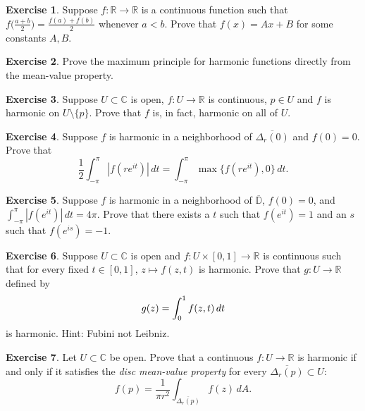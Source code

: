 \documentclass[12pt,openany]{book}
\newcommand{\avoidbreak}{\postdisplaypenalty=100}
\newcommand{\abs}[1]{\left\lvert {#1} \right\rvert}
\newcommand{\C}{{\mathbb{C}}}
\newcommand{\R}{{\mathbb{R}}}
\newcommand{\D}{{\mathbb{D}}}
\newcommand{\myindex}[1]{#1\index{#1}}
\theoremstyle{plain}
\theoremstyle{remark}
\theoremstyle{definition}
\newenvironment{exbox}{%
    \def\FrameCommand{\vrule width 1pt \relax\hspace{10pt}}%
    \MakeFramed{\advance\hsize-\width\FrameRestore}%
}{%
    \endMakeFramed
}
\theoremstyle{exercise}
\newtheorem{exercise}{Exercise}[section]
\theoremstyle{example}
\begin{document}
\begin{exbox}
\begin{exercise}
Suppose $f \colon \R \to \R$ is a continuous function such that
$f\bigl(\frac{a+b}{2}\bigr) = \frac{f(a)+f(b)}{2}$ whenever $a < b$.
Prove that $f(x) = Ax + B$ for some constants $A,B$.
\end{exercise}

\begin{exercise}
Prove the maximum principle for harmonic functions directly from the
mean-value property.
\end{exercise}

\begin{exercise}
Suppose $U \subset \C$ is open, $f \colon U \to \R$ is continuous, $p \in U$
and $f$ is harmonic on $U \setminus \{ p \}$.  Prove that $f$ is, in fact,
harmonic on all of $U$.
\end{exercise}

\begin{exercise}
Suppose $f$ is harmonic in a neighborhood of
$\overline{\Delta_r(0)}$ and
$f(0) = 0$.  Prove that
\begin{equation*}
\frac{1}{2} \int_{-\pi}^\pi \abs{f(re^{it})} \, dt = 
\int_{-\pi}^\pi \max \{ f(re^{it}), 0 \} \, dt .
\end{equation*}
\end{exercise}

\begin{exercise}
Suppose $f$ is harmonic in a neighborhood of
$\overline{\D}$, $f(0) = 0$, and $\int_{-\pi}^\pi \abs{f(e^{it})}\, dt =
4\pi$.
Prove that there exists a $t$ such that $f(e^{it}) = 1$ and an $s$ such that
$f(e^{is}) = -1$.
\end{exercise}

\begin{exercise}
Suppose $U \subset \C$ is open and
$f \colon U \times [0,1] \to \R$ is continuous
such that for every fixed $t \in [0,1]$, $z \mapsto f(z,t)$ is harmonic.
Prove that $g \colon U \to \R$ defined by
\begin{equation*}
g(z) = \int_0^1 f(z,t) \, dt
\avoidbreak
\end{equation*}
is harmonic.  Hint: Fubini not Leibniz.
\end{exercise}

\begin{exercise}
Let $U \subset \C$ be open.
Prove that a continuous $f \colon U \to \R$
is harmonic if and only if it satisfies the
\emph{\myindex{disc mean-value property}} for every $\overline{\Delta_r(p)}
\subset U$:
\begin{equation*}
f(p) = 
\frac{1}{\pi r^2} \int_{\overline{\Delta_r(p)}} f(z) \, dA.
\end{equation*}
\end{exercise}


\end{exbox}
\end{document}

